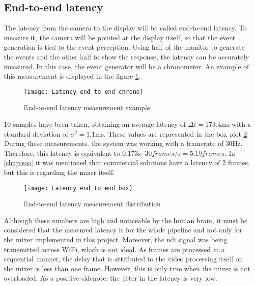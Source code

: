 \documentclass[../main.tex]{subfiles}
\begin{document}
\subsection{End-to-end latency}
The latency from the camera to the display will be called end-to-end latency. To measure it, the camera will be pointed at the display itself, so that the event generation is tied to the event perception. Using half of the monitor to generate the events and the other half to show the response, the latency can be accurately measured. In this case, the event generator will be a chronometer. An example of this measurement is displayed in the figure \ref{fig:05:latency_e2e_chrono}.\newline

\begin{figure}[htbp]
    \centering
    \texttt{[image: Latency end to end chrono]}
    \caption{End-to-end latency measurement example}
    \label{fig:05:latency_e2e_chrono}
\end{figure}

10 samples have been taken, obtaining an average latency of $\Delta t = 173.4 \si{\milli\second}$ with a standard deviation of $\sigma^2 = 1.1 \si{\milli\second}$. These values are represented in the box plot \ref{fig:05:latency_e2e_box}. During these measurements, the system was working with a framerate of $30 \si{\hertz}$. Therefore, this latency is equivalent to $0.173 \si{\second} \cdot 30 \si{frames\per\second} = 5.19 \si{frames}$. In \autoref{chap:soa} it was mentioned that commercial solutions have a latency of 2 frames, but this is regarding the mixer itself.\newline

\begin{figure}[htbp]
    \centering
    \texttt{[image: Latency end to end box]}
    \caption{End-to-end latency measurement distribution}
    \label{fig:05:latency_e2e_box}
\end{figure}

Although these numbers are high and noticeable by the human brain, it must be considered that the measured latency is for the whole pipeline and not only for the mixer implemented in this project. Moreover, the \gls{ndi} signal was being transmitted across WiFi, which is not ideal. As frames are processed in a sequential manner, the delay that is attributed to the video processing itself on the mixer is less than one frame. However, this is only true when the mixer is not overloaded. As a positive sidenote, the jitter in the latency is very low.\newline
\end{document}

